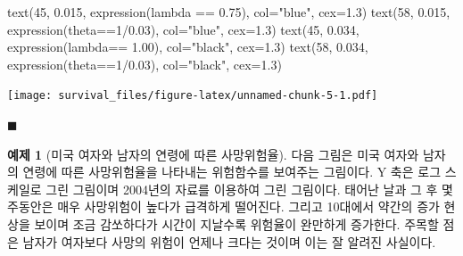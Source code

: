 \documentclass[
]{book}
\newenvironment{Shaded}{\begin{snugshade}}{\end{snugshade}}
\newcommand{\AttributeTok}[1]{\textcolor[rgb]{0.77,0.63,0.00}{#1}}
\newcommand{\DecValTok}[1]{\textcolor[rgb]{0.00,0.00,0.81}{#1}}
\newcommand{\FloatTok}[1]{\textcolor[rgb]{0.00,0.00,0.81}{#1}}
\newcommand{\FunctionTok}[1]{\textcolor[rgb]{0.00,0.00,0.00}{#1}}
\newcommand{\NormalTok}[1]{#1}
\newcommand{\SpecialCharTok}[1]{\textcolor[rgb]{0.00,0.00,0.00}{#1}}
\newcommand{\StringTok}[1]{\textcolor[rgb]{0.31,0.60,0.02}{#1}}
\theoremstyle{definition}
\theoremstyle{definition}
\newtheorem{example}{예제}[chapter]
\theoremstyle{definition}
\theoremstyle{definition}
\theoremstyle{remark}
\begin{document}
\begin{Shaded}
\begin{Highlighting}[]
\FunctionTok{text}\NormalTok{(}\DecValTok{45}\NormalTok{, }\FloatTok{0.015}\NormalTok{, }\FunctionTok{expression}\NormalTok{(lambda }\SpecialCharTok{==} \FloatTok{0.75}\NormalTok{), }\AttributeTok{col=}\StringTok{"blue"}\NormalTok{, }\AttributeTok{cex=}\FloatTok{1.3}\NormalTok{)}
\FunctionTok{text}\NormalTok{(}\DecValTok{58}\NormalTok{, }\FloatTok{0.015}\NormalTok{, }\FunctionTok{expression}\NormalTok{(theta}\SpecialCharTok{==}\DecValTok{1}\SpecialCharTok{/}\FloatTok{0.03}\NormalTok{), }\AttributeTok{col=}\StringTok{"blue"}\NormalTok{, }\AttributeTok{cex=}\FloatTok{1.3}\NormalTok{)}
\FunctionTok{text}\NormalTok{(}\DecValTok{45}\NormalTok{, }\FloatTok{0.034}\NormalTok{, }\FunctionTok{expression}\NormalTok{(lambda}\SpecialCharTok{==} \FloatTok{1.00}\NormalTok{), }\AttributeTok{col=}\StringTok{"black"}\NormalTok{, }\AttributeTok{cex=}\FloatTok{1.3}\NormalTok{)}
\FunctionTok{text}\NormalTok{(}\DecValTok{58}\NormalTok{, }\FloatTok{0.034}\NormalTok{, }\FunctionTok{expression}\NormalTok{(theta}\SpecialCharTok{==}\DecValTok{1}\SpecialCharTok{/}\FloatTok{0.03}\NormalTok{), }\AttributeTok{col=}\StringTok{"black"}\NormalTok{, }\AttributeTok{cex=}\FloatTok{1.3}\NormalTok{)}
\end{Highlighting}
\end{Shaded}

\texttt{[image: survival\_files/figure-latex/unnamed-chunk-5-1.pdf]}

\(\blacksquare\)

\begin{example}[미국 여자와 남자의 연령에 따른 사망위험율]
\protect\hypertarget{exm:unnamed-chunk-6}{}{\label{exm:unnamed-chunk-6} {} }
다음 그림은 미국 여자와 남자의 연령에 따른 사망위험율을 나타내는 위험함수를 보여주는 그림이다.
Y 축은 로그 스케일로 그린 그림이며 2004년의 자료를 이용하여 그린 그림이다.
태어난 날과 그 후 몇 주동안은 매우 사망위험이 높다가 급격하게 떨어진다. 그리고 10대에서 약간의 증가 현상을 보이며 조금 감쏘하다가 시간이 지날수록 위험율이 완만하게 증가한다. 주목할 점은 남자가 여자보다 사망의 위험이 언제나 크다는 것이며 이는 잘 알려진 사실이다.
\end{example}
\end{document}
